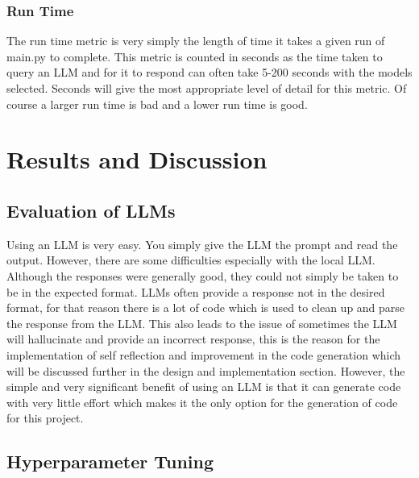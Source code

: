 \documentclass[12pt]{extarticle}
\begin{document}
\subsubsection{Run Time}

The run time metric is very simply the length of time it takes a given run of main.py to complete. This metric is counted in seconds as the time taken to query an LLM and for it to respond can often take 5-200 seconds with the models selected. Seconds will give the most appropriate level of detail for this metric. Of course a larger run time is bad and a lower run time is good.
\newpage
\section{Results and Discussion}


\subsection{Evaluation of LLMs}

Using an LLM is very easy. You simply give the LLM the prompt and read the output. However, there are some difficulties especially with the local LLM. Although the responses were generally good, they could not simply be taken to be in the expected format. LLMs often provide a response not in the desired format, for that reason there is a lot of code which is used to clean up and parse the response from the LLM. This also leads to the issue of sometimes the LLM will hallucinate and provide an incorrect response, this is the reason for the implementation of self reflection and improvement in the code generation which will be discussed further in the design and implementation section. However, the simple and very significant benefit of using an LLM is that it can generate code with very little effort which makes it the only option for the generation of code for this project.

\subsection{Hyperparameter Tuning}
\end{document}
